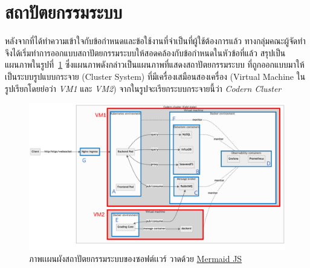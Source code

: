 \documentclass[12pt,one side,openright,a4paper]{cpe-thesis-th}
\newcommand{\thaijustify}[1]{%
  \par\hspace{30pt}\justifying
  #1
}
\begin{document}
\section{สถาปัตยกรรมระบบ}
    \thaijustify{
        หลังจากที่ได้ทำความเข้าใจกับข้อกำหนดและข้อใช้งานที่จำเป็นที่ผู้ใช้ต้องการแล้ว ทางกลุ่มคณะผู้จัดทำจึงได้เริ่มทำการออกแบบสถาปัตยกรรมระบบให้สอดคล้องกับข้อกำหนดในหัวข้อที่แล้ว สรุปเป็นแผนภาพในรูปที่~\ref{fig:arch} ซึ่งแผนภาพดังกล่าวเป็นแผนภาพที่แสดงสถาปัตยกรรมระบบ ที่ถูกออกแบบมาให้เป็นระบบรูปแบบกระจาย (Cluster System) ที่มีเครื่องเสมือนสองเครื่อง (Virtual Machine ในรูปเรียกโดยย่อว่า \textit{VM1} และ \textit{VM2}) จากในรูปจะเรียกระบบกระจายนี้ว่า \textit{Codern Cluster}
    }
    \begin{figure}[!h]
    \centering
        \includegraphics[width=15cm]{figure/diagram/architecture-v1.png}
    \caption[ภาพเเผนผังสถาปัตยกรรมระบบของซอฟต์เเวร์]{ภาพเเผนผังสถาปัตยกรรมระบบของซอฟต์เเวร์ วาดด้วย \href{https://mermaid.js.org/}{Mermaid JS}}\label{fig:arch}
    \end{figure}
\end{document}
